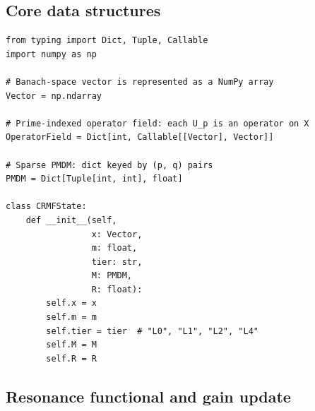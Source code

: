 \documentclass[11pt]{article}
\begin{document}
\subsection{Core data structures}

\begin{verbatim}
from typing import Dict, Tuple, Callable
import numpy as np

# Banach-space vector is represented as a NumPy array
Vector = np.ndarray

# Prime-indexed operator field: each U_p is an operator on X
OperatorField = Dict[int, Callable[[Vector], Vector]]

# Sparse PMDM: dict keyed by (p, q) pairs
PMDM = Dict[Tuple[int, int], float]

class CRMFState:
    def __init__(self,
                 x: Vector,
                 m: float,
                 tier: str,
                 M: PMDM,
                 R: float):
        self.x = x
        self.m = m
        self.tier = tier  # "L0", "L1", "L2", "L4"
        self.M = M
        self.R = R
\end{verbatim}

\subsection{Resonance functional and gain update}
\end{document}
